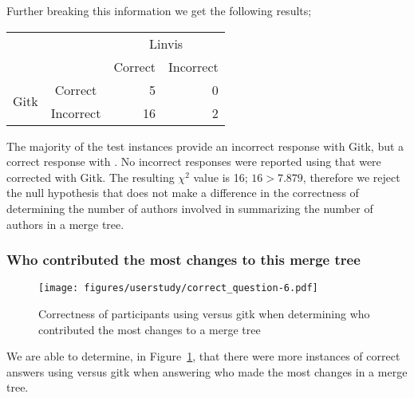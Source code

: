 Further breaking this information we get the following results;




\begin{center}
  \begin{tabular}{cc|rr}
                           &           & \multicolumn{2}{c}{Linvis}\\
                           &           & Correct                      & Incorrect\\\hline
    \multirow{2}{*}{Gitk}  & Correct   & 5                            & 0\\
                           & Incorrect & 16                           & 2\\
  \end{tabular}
\end{center}

The majority of the test instances provide an incorrect response with
Gitk, but a correct response with \tool. No incorrect responses were
reported using \tool that were corrected with Gitk. The resulting
$\chi^2$ value is 16; $16 > 7.879$, therefore we reject the null
hypothesis that \tool does not make a difference in the correctness of
determining the number of authors involved in summarizing the number of
authors in a merge tree.


\subsubsection{Who contributed the most changes to this merge tree}
\label{ssub:who_contributed_the_most_changes_to_this_merge_tree}

\begin{figure}[htpb]
  \centering
  \texttt{[image: figures/userstudy/correct\_question-6.pdf]}
  \caption{Correctness of participants using \tool versus gitk when
    determining who contributed the most changes to a merge tree}
  \label{fig:q_6_correctness}
\end{figure}

We are able to determine, in Figure~\ref{fig:q_6_correctness}, that
there were more instances of correct answers using \tool versus gitk
when answering who made the most changes in a merge tree.

